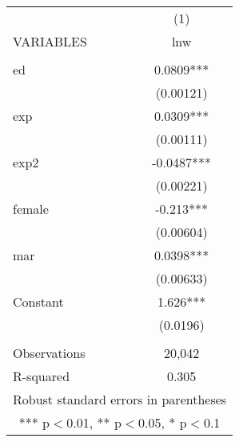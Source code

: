 \begin{tabular}{lc} \hline
 & (1) \\
VARIABLES & lnw \\ \hline
 &  \\
ed & 0.0809*** \\
 & (0.00121) \\
exp & 0.0309*** \\
 & (0.00111) \\
exp2 & -0.0487*** \\
 & (0.00221) \\
female & -0.213*** \\
 & (0.00604) \\
mar & 0.0398*** \\
 & (0.00633) \\
Constant & 1.626*** \\
 & (0.0196) \\
 &  \\
Observations & 20,042 \\
 R-squared & 0.305 \\ \hline
\multicolumn{2}{c}{ Robust standard errors in parentheses} \\
\multicolumn{2}{c}{ *** p$<$0.01, ** p$<$0.05, * p$<$0.1} \\
\end{tabular}
